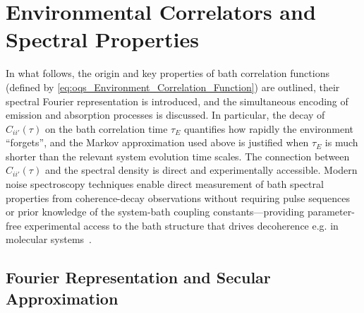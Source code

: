 \section{Environmental Correlators and Spectral Properties}
\label{sec:oqs_environmental_correlation_functions}

In what follows, the origin and key properties of bath correlation functions (defined by \autoref{eq:oqs_Environment_Correlation_Function}) are outlined, their spectral Fourier representation is introduced, and the simultaneous encoding of emission and absorption processes is discussed.
In particular, the decay of $C_{ii'}(\tau)$ on the bath correlation time $\tau_E$ quantifies how rapidly the environment “forgets”, and the Markov approximation used above is justified when $\tau_E$ is much shorter than the relevant system evolution time scales.
The connection between $C_{ii'}(\tau)$ and the spectral density is direct and experimentally accessible. Modern noise spectroscopy techniques enable direct measurement of bath spectral properties from coherence-decay observations without requiring pulse sequences or prior knowledge of the system-bath coupling constants---providing parameter-free experimental access to the bath structure that drives decoherence e.g. in molecular systems~\cite{vezvaeeetal2024fouriertransformnoise}.


\subsection{Fourier Representation and Secular Approximation}
\label{subsec:oqs_Fourier_and_secular}

